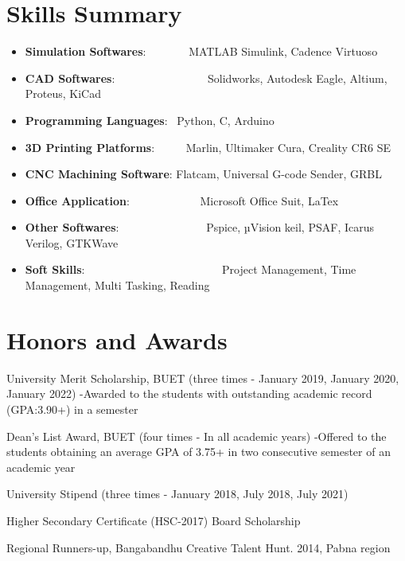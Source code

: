 \documentclass[a4paper,20pt]{article}
\newcommand{\resumeItem}[2]{
  \item\small{
    \textbf{#1}{: #2 \vspace{-2pt}}
  }
}
\newcommand{\resumeSubItem}[2]{\resumeItem{#1}{#2}\vspace{-3pt}}
\newcommand{\resumeSubHeadingListStart}{\begin{itemize}[leftmargin=*]}
\newcommand{\resumeSubHeadingListEnd}{\end{itemize}}
\begin{document}
\section{\textbf{Skills Summary}}
	\resumeSubHeadingListStart
        \resumeSubItem{Simulation Softwares}{~~~~~~~MATLAB Simulink, Cadence Virtuoso}
         \resumeSubItem{CAD Softwares}{~~~~~~~~~~~~~~~~Solidworks, Autodesk Eagle, Altium, Proteus, KiCad}
	\resumeSubItem{Programming Languages}{~Python, C, Arduino}
	\resumeSubItem{3D Printing Platforms}{~~~~~Marlin, Ultimaker Cura, Creality CR6 SE}
        \resumeSubItem{CNC Machining Software}{Flatcam, Universal G-code Sender, GRBL}
	\resumeSubItem{Office Application}{~~~~~~~~~~~~Microsoft Office Suit, LaTex}
        \resumeSubItem{Other Softwares}{~~~~~~~~~~~~~~~Pspice, µVision  keil, PSAF, Icarus Verilog, GTKWave }
	\resumeSubItem{Soft Skills}{~~~~~~~~~~~~~~~~~~~~~~~~Project Management, Time Management, Multi Tasking, Reading}
\resumeSubHeadingListEnd
\vspace{2pt}
\section{\textbf{Honors and Awards}}
\begin{description}[font=$\bullet$]
\item {University Merit Scholarship, BUET (three times - January 2019, January 2020, January 2022)
\newline-Awarded to the students with outstanding academic record (GPA:3.90+) in a semester}
\vspace{-6pt}
\item {Dean's List Award, BUET (four times - In all academic years)
\newline-Offered to the students obtaining an average GPA of 3.75+ in two consecutive semester of an academic year}
\vspace{-6pt}
\item {University Stipend (three times - January 2018, July 2018, July 2021)}
\vspace{-6pt}
\item {Higher Secondary Certificate (HSC-2017) Board Scholarship}
\vspace{-6pt}
\item {Regional Runners-up, Bangabandhu Creative Talent Hunt. 2014, Pabna region}


\end{description}
\vspace{-6pt}
\end{document}
